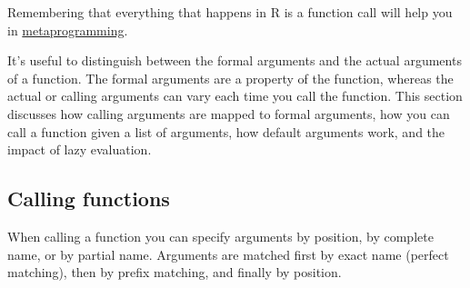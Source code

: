 Remembering that everything that happens in R is a function call will
help you in \hyperref[metaprogramming]{metaprogramming}.


It's useful to distinguish between the formal arguments and the actual
arguments of a function. The formal arguments are a property of the
function, whereas the actual or calling arguments can vary each time you
call the function. This section discusses how calling arguments are
mapped to formal arguments, how you can call a function given a list of
arguments, how default arguments work, and the impact of lazy
evaluation.

\subsection{Calling functions}

When calling a function you can specify arguments by position, by
complete name, or by partial name. Arguments are matched first by exact
name (perfect matching), then by prefix matching, and finally by
position. 

\begin{Shaded}
\begin{Highlighting}[]
\StringTok{ }
  \NormalTok{(}   
\NormalTok{\}}
\NormalTok{(}\NormalTok{(}\NormalTok{, }\NormalTok{, }\NormalTok{))}
\NormalTok{(}\NormalTok{(}\NormalTok{, }\NormalTok{, } \NormalTok{))}

\NormalTok{(}\NormalTok{(}\NormalTok{, }\NormalTok{, } \NormalTok{))}

\NormalTok{(}\NormalTok{(}\NormalTok{, }\NormalTok{, } \NormalTok{))}
\end{Highlighting}
\end{Shaded}

